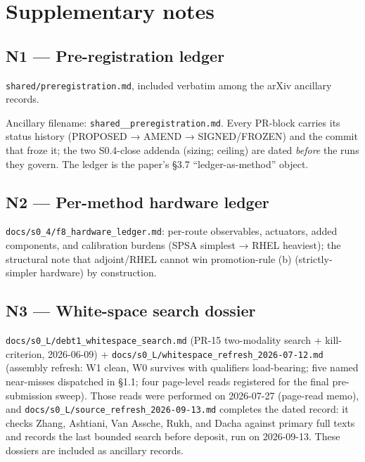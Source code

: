 \documentclass[
  10pt,
]{article}
\begin{document}
\clearpage

\section{Supplementary notes}\label{supplementary-notes}

\subsection{N1 --- Pre-registration
ledger}\label{n1-pre-registration-ledger}

\texttt{shared/preregistration.md}, included verbatim among the arXiv
ancillary records.

Ancillary filename: \texttt{shared\_\_preregistration.md}. Every
PR-block carries its status history (PROPOSED → AMEND → SIGNED/FROZEN)
and the commit that froze it; the two S0.4-close addenda (sizing;
ceiling) are dated \emph{before} the runs they govern. The ledger is the
paper's §3.7 ``ledger-as-method'' object.

\subsection{N2 --- Per-method hardware
ledger}\label{n2-per-method-hardware-ledger}

\texttt{docs/s0\_4/f8\_hardware\_ledger.md}: per-route observables,
actuators, added components, and calibration burdens (SPSA simplest →
RHEL heaviest); the structural note that adjoint/RHEL cannot win
promotion-rule (b) (strictly-simpler hardware) by construction.

\subsection{N3 --- White-space search
dossier}\label{n3-white-space-search-dossier}

\texttt{docs/s0\_L/debt1\_whitespace\_search.md} (PR-15 two-modality
search + kill-criterion, 2026-06-09) +
\texttt{docs/s0\_L/whitespace\_refresh\_2026-07-12.md} (assembly
refresh: W1 clean, W0 survives with qualifiers load-bearing; five named
near-misses dispatched in §1.1; four page-level reads registered for the
final pre-submission sweep). Those reads were performed on 2026-07-27
(page-read memo), and \texttt{docs/s0\_L/source\_refresh\_2026-09-13.md}
completes the dated record: it checks Zhang, Ashtiani, Van Assche, Rukh,
and Dacha against primary full texts and records the last bounded search
before deposit, run on 2026-09-13. These dossiers are included as
ancillary records.
\end{document}
